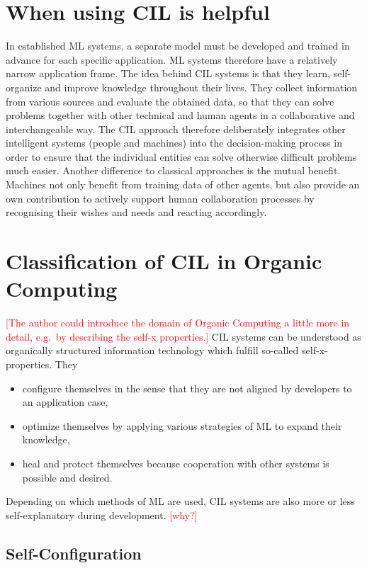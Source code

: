 \documentclass[conference]{IEEEtran}
\newcommand\notes[1]{\textcolor{red}{#1}}
\begin{document}
\section{When using CIL is helpful}\label{AdvantageOfCIL}
In established ML systems, a separate model must be developed and trained in advance for 
each specific application. ML systems therefore have a relatively narrow application frame. 
The idea behind CIL systems is that they learn, self-organize and improve knowledge throughout their lives. 
They collect information from various sources and evaluate the obtained data, so that they 
can solve problems together with other technical and human agents in a 
collaborative and interchangeable way\cite{CIL:sick}.
The CIL approach therefore deliberately integrates other intelligent systems 
(people and machines) into the decision-making process in order to ensure that the individual entities 
can solve otherwise difficult problems much easier.
Another difference to classical approaches is the mutual benefit. 
Machines not only benefit from training data of other agents, but also provide 
an own contribution to actively support human collaboration processes by 
recognising their wishes and needs and reacting accordingly\cite{CIL:sick}.

\section{Classification of CIL in Organic Computing}
\notes{[The author could introduce the domain of Organic Computing a little more in detail, e.g.\ by describing the self-x properties.]}
CIL systems can be understood as organically structured information technology
which fulfill so-called self-x-properties\cite{Organic:schloer}\cite{Organic:schmeck}.
They
\begin{itemize}
    \item configure themselves in the sense that they are not aligned by developers to an application case,
    \item optimize themselves by applying various strategies of ML to expand their knowledge,
    \item heal and protect themselves because cooperation with other systems is possible and desired.
\end{itemize}
Depending on which methods of ML are used, CIL systems are also more or less self-explanatory 
during development\cite{Organic:schloer}.
\notes{[why?]}

\subsection{Self-Configuration}
\end{document}
